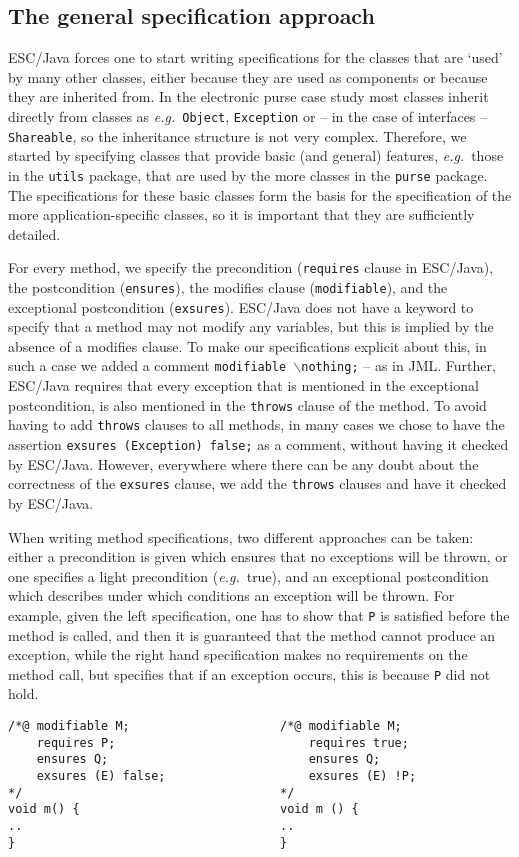 \documentclass[a4paper]{llncs}
\newcommand{\noth}{\(\backslash\)\texttt{nothing}}
\begin{document}
\subsection{The general specification approach}
ESC/Java forces one to start writing specifications for the classes
that are `used' by many other classes, either because they are used as 
components or because they are inherited from. In the electronic purse 
case study most classes inherit directly from classes as
\emph{e.g.}~\texttt{Object}, \texttt{Exception} or -- in the case of
interfaces -- \texttt{Shareable}, so the inheritance structure is not
very complex. Therefore, we started by specifying classes that
provide basic (and general) features, \emph{e.g.}~those in the
\texttt{utils} package,
that are used by the more classes in the \texttt{purse} package. The
specifications for these basic classes form the basis for the
specification of the more application-specific classes, so it is
important that they are sufficiently detailed.

For every method, we specify the precondition (\texttt{requires} clause
in ESC/Java), the postcondition (\texttt{ensures}), the modifies
clause (\texttt{modifiable}), and the exceptional postcondition
(\texttt{exsures}). ESC/Java does not have a keyword to specify that a
method may not modify any variables, but this is implied by the
absence of a modifies clause. To make our specifications explicit
about this, in such a case we added a comment
\texttt{modifiable \noth;} -- as in JML. Further, ESC/Java requires 
that every exception that is mentioned in the exceptional
postcondition, is also mentioned in the \texttt{throws} clause of the
method. To avoid having to add \texttt{throws} clauses to all methods,
in many cases we chose to have the assertion \texttt{exsures
(Exception) false;} as a comment, without having it checked by
ESC/Java. However, everywhere where there can be any doubt about the
correctness of the \texttt{exsures} clause, we add the \texttt{throws}
clauses and have it checked by ESC/Java.

When writing method specifications, two different approaches can be
taken: either a precondition is given which ensures that no exceptions
will be thrown, or one specifies a light precondition
(\emph{e.g.}~true), and an exceptional postcondition which describes
under which conditions an exception will be thrown. For example, given
the left specification, one has to show that \texttt{P} is satisfied
before the method is called, and then it is guaranteed that the method
cannot produce an exception, while the right hand specification makes
no requirements on the method call, but specifies that if an exception
occurs, this is because \texttt{P} did not hold.
\begin{verbatim}
/*@ modifiable M;                     /*@ modifiable M;
    requires P;                           requires true;
    ensures Q;                            ensures Q;
    exsures (E) false;                    exsures (E) !P;
*/                                    */
void m() {                            void m () {
..                                    ..
}                                     }
\end{verbatim}
\end{document}
